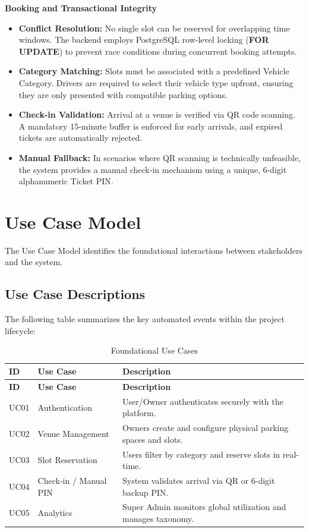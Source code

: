 \textbf{Booking and Transactional Integrity}
\begin{itemize}
    \item \textbf{Conflict Resolution:} No single slot can be reserved for overlapping time windows. The backend employs PostgreSQL row-level locking (\textbf{FOR UPDATE}) to prevent race conditions during concurrent booking attempts.
    \item \textbf{Category Matching:} Slots must be associated with a predefined Vehicle Category. Drivers are required to select their vehicle type upfront, ensuring they are only presented with compatible parking options.
    \item \textbf{Check-in Validation:} Arrival at a venue is verified via QR code scanning. A mandatory 15-minute buffer is enforced for early arrivals, and expired tickets are automatically rejected.
    \item \textbf{Manual Fallback:} In scenarios where QR scanning is technically unfeasible, the system provides a manual check-in mechanism using a unique, 6-digit alphanumeric Ticket PIN.
\end{itemize}

\section{Use Case Model}
The Use Case Model identifies the foundational interactions between stakeholders and the system.

\subsection{Use Case Descriptions}
The following table summarizes the key automated events within the project lifecycle:

\begin{longtable}{|p{2cm}|p{4cm}|p{8cm}|}
    \caption{Foundational Use Cases} \label{tab:use_cases} \\
    \hline
    \textbf{ID} & \textbf{Use Case} & \textbf{Description} \\
    \hline
    \endfirsthead
    \hline
    \textbf{ID} & \textbf{Use Case} & \textbf{Description} \\
    \hline
    \endhead
    UC01 & Authentication & User/Owner authenticates securely with the platform. \\
    \hline
    UC02 & Venue Management & Owners create and configure physical parking spaces and slots. \\
    \hline
    UC03 & Slot Reservation & Users filter by category and reserve slots in real-time. \\
    \hline
    UC04 & Check-in / Manual PIN & System validates arrival via QR or 6-digit backup PIN. \\
    \hline
    UC05 & Analytics & Super Admin monitors global utilization and manages taxonomy. \\
    \hline
\end{longtable}

